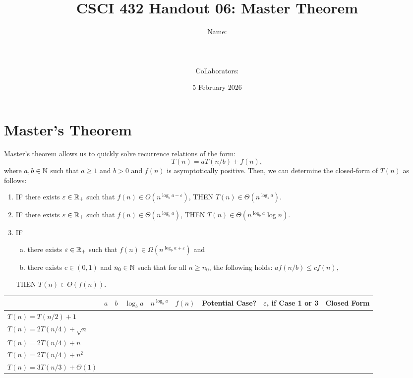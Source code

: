 \documentclass{article}
\title{CSCI 432 Handout 06: Master Theorem}
\author{Name: \rule{3in}{0.15mm} \\~\\
    Collaborators: \rule{3in}{0.15mm} }
\date{5 February 2026}
\begin{document}
\maketitle

\noindent
\section*{Master's Theorem}

Master's theorem allows us to quickly solve recurrence relations of the form:
$$ T(n) = a T(n/b) + f(n),$$
where $a, b \in {\mathbb N}$ such that $a \geq 1$ and $b >0$ and $f(n)$ is asymptotically
positive.  Then, we can determine the closed-form of $T(n)$ as follows:
\begin{enumerate}
    \item IF there exists $\varepsilon \in {\mathbb R}_+$ such that $f(n) \in O(n^{\log_b
        a - \varepsilon})$, THEN $T(n) \in \Theta(n^{\log_b a})$.
    \item IF there exists $\varepsilon \in {\mathbb R}_+$ such that $f(n) \in \Theta(n^{\log_b
        a})$, THEN $T(n) \in \Theta(n^{\log_b a}\log n)$.
    \item IF
        \begin{enumerate}[(a)]
            \item there exists $\varepsilon \in {\mathbb R}_+$ such that $f(n) \in \Omega(n^{\log_b
                a + \varepsilon})$ and
            \item there exists $c \in (0,1)$ and $n_0 \in {\mathbb N}$ such that for all $n
                \geq n_0$, the following holds: $a f(n/b) \leq c
                f(n)$,\label{regularity}
        \end{enumerate}
        THEN $T(n) \in \Theta(f(n))$.
\end{enumerate}

\pagebreak

\begin{table}[h!]
    \centering
    \begin{tabular}{|l|l|l|l|l|l|l|l|l|}
        \hline
        &  $a$ & $b$  & $\log_b a$  & $n^{\log_b a}$  & $f(n)$  & Potential
        Case? & $\varepsilon$, if Case 1 or 3  & Closed Form \\ \hline
        \hline
        $T(n) = T(n/2)+1$             & &  &  &  &  & & & \\[5ex] \hline
        $T(n) = 2 T(n/4) + \sqrt{n}$  & &  &  &  & &  & & \\[5ex] \hline
        $T(n) = 2 T(n/4) + n$         & &  &  &  &  & & &  \\[5ex] \hline
        $T(n) = 2 T(n/4) + n^2$       & &  &  &  &  & & & \\[5ex] \hline
        $T(n) = 3 T(n/3) + \Theta(1)$ & &  &  &  & & & & \\[5ex] \hline
    \end{tabular}
\end{table}
\end{document}
